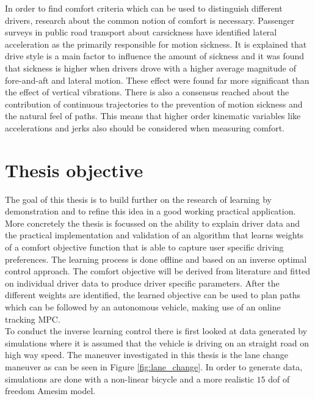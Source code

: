 In order to find comfort criteria which can be used to distinguish different drivers, research about the common notion of comfort is necessary. Passenger surveys in public road transport about carsickness \cite{Turner1999} have identified lateral acceleration as the primarily responsible for motion sickness. It is explained that drive style is a main factor to influence the amount of sickness and it was found that sickness is higher when drivers drove with a higher average magnitude of fore-and-aft and lateral motion. These effect were found far more significant than the effect of vertical vibrations. There is also a consensus reached about the contribution of continuous trajectories to the prevention of motion sickness and the natural feel of paths.\cite{Elbanhawi2015} This means that higher order kinematic variables like accelerations and jerks also should be considered when measuring comfort.\\

\section{Thesis objective}
The goal of this thesis is to build further on the research of learning by demonstration \cite{Kuderer2015a} and to refine this idea in a good working practical application. More concretely the thesis is focussed on the ability to explain driver data and the practical implementation and validation of an algorithm that learns weights of a comfort objective function that is able to capture user specific driving preferences. The learning process is done offline and based on an inverse optimal control approach. The comfort objective will be derived from literature and fitted on individual driver data to produce driver specific parameters. After the different weights are identified, the learned objective can be used to plan paths which can be followed by an autonomous vehicle, making use of an online tracking MPC.\\


To conduct the inverse learning control there is first looked at data generated by simulations where it is assumed that the vehicle is driving on an straight road on high way speed. The maneuver investigated in this thesis is the lane change maneuver as can be seen in Figure \ref{fig:lane_change}. In order to generate data, simulations are done with a non-linear bicycle and a more realistic $15$ dof of freedom Amesim model.


